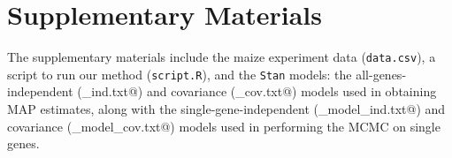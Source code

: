 \documentclass[useAMS,usenatbib,referee]{biom}
\begin{document}

\section*{Supplementary Materials}

The supplementary materials include the maize experiment data ({\tt data.csv}), a script to run our method ({\tt script.R}), and the {\tt Stan} models: the all-genes-independent (\verb@model_ind.txt@) and covariance (\verb@model_cov.txt@) models used in obtaining MAP estimates, along with the single-gene-independent (\verb@sg_model_ind.txt@) and covariance (\verb@sg_model_cov.txt@) models used in performing the MCMC on single genes. 





\label{lastpage}
\end{document}
